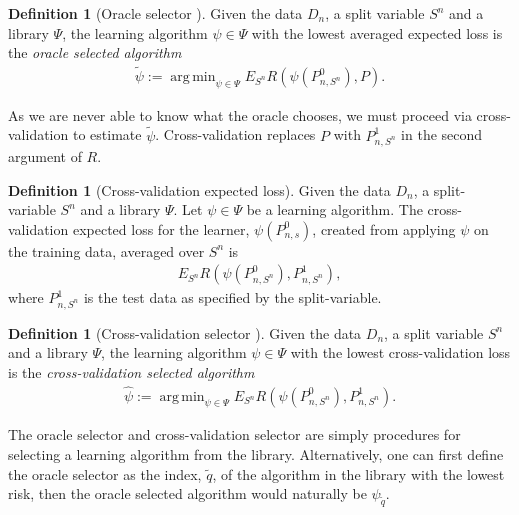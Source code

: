 \documentclass[11pt, a4paper]{article}
\DeclareMathOperator*{\argmin}{arg\,min}
\theoremstyle{definition}
\newtheorem{definition}[theorem]{Definition}
\theoremstyle{remark}
\newcommand{\q}{q}
\newcommand{\btheta}{\theta}
\newcommand{\la}{\psi}
\newcommand{\Sn}{S^n}
\newcommand{\lib}{\Psi}
\begin{document}
\begin{definition}[Oracle selector \parencite{laan03}]
    Given the data $ D_n $, a split variable $ \Sn $ and a library $ \lib $, the learning algorithm $ \la \in \lib $ with the lowest averaged expected loss is the \textit{oracle selected algorithm}
    \begin{align*}
        \tilde{\la} := \argmin_{\la \in \lib} E_{\Sn} R(\la(P_{n,\Sn}^0 ) , P).
    \end{align*}
\end{definition}
As we are never able to know what the oracle chooses, we must proceed via cross-validation to estimate $ \tilde{\la}  $. Cross-validation replaces $ P $ with $ P_{n, \Sn}^{1} $ in the second argument of $ R $.
\begin{definition}[Cross-validation expected loss]
     Given the data $D_n$, a split-variable $\Sn$ and a library $ \lib $. Let $ \la \in \lib $ be a learning algorithm. The cross-validation expected loss for the learner, $\la(P_{n,s}^0)$, created from applying $ \la $ on the training data, averaged over $ \Sn $ is  
    \begin{align*}
        E_{\Sn} R( \la(P_{n,\Sn}^{0}), P_{n, \Sn}^{1}),
    \end{align*}
    where $ P_{n,\Sn}^{1} $ is the test data as specified by the split-variable.
\end{definition}

\begin{definition}[Cross-validation selector \parencite{laan03}]
    Given the data $ D_n $, a split variable $ \Sn $ and a library $ \lib $, the learning algorithm $ \la \in \lib $ with the lowest cross-validation loss is the \textit{cross-validation selected algorithm}
    \begin{align*}
        \hat{\la} := \argmin_{\la \in \lib} E_{\Sn} R(\la(P_{n,\Sn}^0 ) , P_{n, \Sn}^{1}).
    \end{align*}
\end{definition}
%
The oracle selector and cross-validation selector are simply procedures for selecting a learning algorithm from the library. Alternatively, one can first define the oracle selector as the index, $ \tilde{\q} $, of the algorithm in the library with the lowest risk, then the oracle selected algorithm would naturally be $ \la_{ \tilde{\q} } $.
\end{document}
